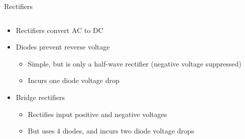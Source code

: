 \documentclass{beamer}
\begin{document}
\begin{frame}{Rectifiers}
  \begin{columns}[T]
    \begin{column}{.6\textwidth}
      \begin{itemize}
        \item Rectifiers convert AC to DC
        \item Diodes prevent reverse voltage
        \begin{itemize}
          \item Simple, but is only a half-wave rectifier (negative voltage suppressed)
          \item Incurs one diode voltage drop
        \end{itemize}
        \item Bridge rectifiers 
        \begin{itemize}
          \item Rectifies input positive and negative voltages
          \item But uses 4 diodes, and incurs two diode voltage drops
        \end{itemize}        
      \end{itemize}
    \end{column}

    \begin{column}{0.4\textwidth} \centering
    \end{column}
  \end{columns}
\end{frame}
\end{document}
